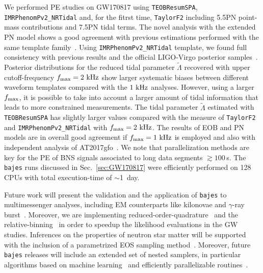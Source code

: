 \documentclass[prd,aps,twocolumn,a4paper,showkeys,nofootinbib,floatfix]{revtex4-1}
\def\tLam{{\tilde\Lambda}}
\newcommand{\bajes}{{\tt bajes}}
\begin{document}
We performed PE studies on GW170817 using {\tt TEOBResumSPA}, {\tt IMRPhenomPv2\_NRTidal} 
	and, for the fitrst time, {\tt TaylorF2} including 5.5PN point-mass contributions
  and 7.5PN tidal terms.
  The novel analysis with the extended PN model shows a good agreement with
  previous estimations performed with the same template family~\cite{LIGOScientific:2018mvr,Abbott:2018wiz}.
  Using {\tt IMRPhenomPv2\_NRTidal} template,
  we found full consistency with previous results and 
  the official LIGO-Virgo posterior samples~\cite{LIGOScientific:2018mvr,Abbott:2018wiz}.
 Posterior distributions for the reduced tidal parameter $\tLam$
 recovered with upper cutoff-frequency $f_{\rm max}=2~{\rm kHz}$ 
 show larger systematic biases between different waveform templates
 compared with the $1~{\rm kHz}$ analyses.
 However, using a larger $f_{\rm max}$, it is possible to take into account 
 a larger amount of tidal information that leads to more constrained measurements. 
 The tidal parameter $\tLam$ estimated with {\tt TEOBResumSPA} 
 has slightly larger values compared with the measure of {\tt TaylorF2}
 and {\tt IMRPhenomPv2\_NRTidal} with $f_{\rm max}=2~{\rm kHz}$.
 The results of EOB and PN models are in 
 overall good agreement if $f_{\rm max}=1~{\rm kHz}$ is employed and also with independent analysis of AT2017gfo~\cite{Breschi:2021tbm}.
  We note that parallelization methods are key for the PE of BNS
  signals associated to long data segments ${\gtrsim} 100\,$s.
  The {\bajes} runs discussed in Sec.~\ref{sec:GW170817} were
  efficiently performed on 128 CPUs with total
  execution-time of ${\sim}$1~day. 

Future work will present the validation and the application of
{\bajes} to multimessenger analyses, including EM counterparts like
kilonovae and $\gamma$-ray burst~\citep[e.g.][]{Hayes:2019hso,Breschi:2021tbm}.
Moreover, we are implementing 
reduced-order-quadrature~\cite{Canizares:2014fya,Smith:2016qas,Morisaki:2020oqk}
and the relative-binning~\cite{Zackay:2018qdy,Dai:2018dca} in order 
to speedup the likelihood evaluations in the GW studies.
Inferences on the properties of neutron star matter will be supported
with the inclusion of a parametrized EOS sampling
method~\cite{Read:2008iy,Raithel:2016bux}.
Moreover, future {\bajes} releases will include an extended set of 
nested samplers, in particular 
algorithms based on machine learning~\citep[e.g.][]{albert2020jaxns} 
and efficiently parallelizable routines~\citep[e.g.][]{buchner2021ultranest}.\\
\end{document}
